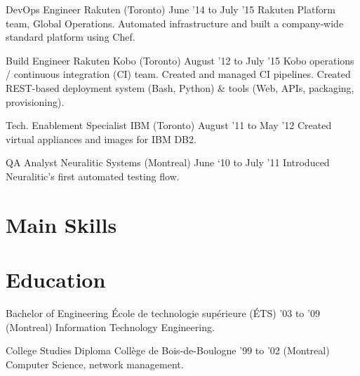 \documentclass[]{cvpn}
\begin{document}
\begin{multicols}{2}
\begin{eventlist}
\item{DevOps Engineer}
     {Rakuten (Toronto)}
     {June '14 to July '15}
{
Rakuten Platform team, Global Operations.
Automated infrastructure and built a company-wide
standard platform using Chef.
}

\eventlink{}

\item{Build Engineer}
     {Rakuten Kobo (Toronto)}
     {August '12 to July '15}
{
Kobo operations / continuous integration (CI) team.
Created and managed CI pipelines.
Created REST-based deployment system (Bash, Python) \&
tools (Web, APIs, packaging, provisioning).
}

\item{Tech. Enablement Specialist}
     {IBM (Toronto)}
     {August '11 to May '12}
{
Created virtual appliances and images for IBM DB2.
}

\item{QA Analyst}
     {Neuralitic Systems (Montreal)}
     {June ‘10 to July ’11}
{
Introduced Neuralitic's first automated testing flow.
}

\end{eventlist}

\section{Main Skills}
\begin{skillslist}


\end{skillslist}

\section{Education}
\begin{eventlist}

\item{Bachelor of Engineering}
     {École de technologie supérieure (ÉTS)}
     {'03 to '09}
{
(Montreal) Information Technology Engineering.
}

\item{College Studies Diploma}
     {Collège de Bois-de-Boulogne}
     {'99 to '02}
{
(Montreal) Computer Science, network management.
}


\end{eventlist}
\end{multicols}
\end{document}
